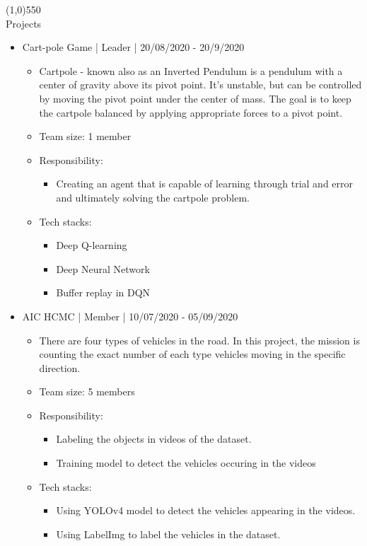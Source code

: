 \documentclass[a4paper, 12pt]{article}
\begin{document}
\line(1,0){550}\\
\vspace{3mm}
{\huge Projects}
\begin{itemize}
    \item Cart-pole Game | Leader | 20/08/2020 - 20/9/2020
      \begin{itemize}
          \item Cartpole - known also as an Inverted Pendulum is a pendulum with a center of gravity above its pivot point. It’s unstable, but can be controlled by moving the pivot point under the center of mass. The goal is to keep the cartpole balanced by applying appropriate forces to a pivot point.
          \item Team size: 1 member
          \item Responsibility:
            \begin{itemize}
                \item Creating an agent that is capable of learning through trial and error and ultimately solving the cartpole problem.
            \end{itemize}
          \item Tech stacks:
            \begin{itemize}
                \item Deep Q-learning
                \item Deep Neural Network
                \item Buffer replay in DQN
            \end{itemize}
        \end{itemize}
    \item AIC HCMC | Member | 10/07/2020 - 05/09/2020
      \begin {itemize}
      \item There are four types of vehicles in the road. In this project, the mission is counting the exact number of each type vehicles moving in the specific direction.
      \item Team size: 5 members
      \item Responsibility:
        \begin{itemize}
          \item Labeling the objects in videos of the dataset.
          \item Training model to detect the vehicles occuring in the videos
        \end{itemize}
      \item Tech stacks: 
        \begin{itemize}
          \item Using YOLOv4 model to detect the vehicles appearing in the videos.
          \item Using LabelImg to label the vehicles in the dataset.
        \end{itemize}
      \end{itemize}


\end{itemize}
\end{document}
